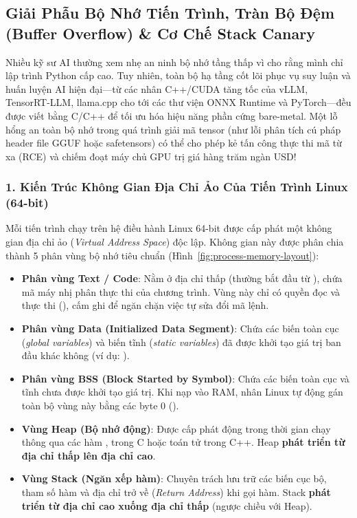 \subsection{Giải Phẫu Bộ Nhớ Tiến Trình, Tràn Bộ Đệm (Buffer Overflow) \& Cơ Chế Stack Canary}
\label{subsec:process-memory-buffer-overflow}
Nhiều kỹ sư AI thường xem nhẹ an ninh bộ nhớ tầng thấp vì cho rằng mình chỉ lập trình Python cấp cao. Tuy nhiên, toàn bộ hạ tầng cốt lõi phục vụ suy luận và huấn luyện AI hiện đại---từ các nhân C++/CUDA tăng tốc của vLLM, TensorRT-LLM, llama.cpp cho tới các thư viện ONNX Runtime và PyTorch---đều được viết bằng C/C++ để tối ưu hóa hiệu năng phần cứng bare-metal. Một lỗ hổng an toàn bộ nhớ trong quá trình giải mã tensor (như lỗi phân tích cú pháp header file GGUF hoặc safetensors) có thể cho phép kẻ tấn công thực thi mã từ xa (RCE) và chiếm đoạt máy chủ GPU trị giá hàng trăm ngàn USD!

\subsubsection{1. Kiến Trúc Không Gian Địa Chỉ Ảo Của Tiến Trình Linux (64-bit)}
Mỗi tiến trình chạy trên hệ điều hành Linux 64-bit được cấp phát một không gian địa chỉ ảo (\textit{Virtual Address Space}) độc lập. Không gian này được phân chia thành 5 phân vùng bộ nhớ tiêu chuẩn (Hình~\ref{fig:process-memory-layout}):
\begin{itemize}
  \item \textbf{Phân vùng Text / Code}: Nằm ở địa chỉ thấp (thường bắt đầu từ ), chứa mã máy nhị phân thực thi của chương trình. Vùng này chỉ có quyền đọc và thực thi (), cấm ghi để ngăn chặn việc tự sửa đổi mã lệnh.
  \item \textbf{Phân vùng Data (Initialized Data Segment)}: Chứa các biến toàn cục (\textit{global variables}) và biến tĩnh (\textit{static variables}) đã được khởi tạo giá trị ban đầu khác không (ví dụ: ).
  \item \textbf{Phân vùng BSS (Block Started by Symbol)}: Chứa các biến toàn cục và tĩnh chưa được khởi tạo giá trị. Khi nạp vào RAM, nhân Linux tự động gán toàn bộ vùng này bằng các byte 0 ().
  \item \textbf{Vùng Heap (Bộ nhớ động)}: Được cấp phát động trong thời gian chạy thông qua các hàm ,  trong C hoặc toán tử  trong C++. Heap \textbf{phát triển từ địa chỉ thấp lên địa chỉ cao}.
  \item \textbf{Vùng Stack (Ngăn xếp hàm)}: Chuyên trách lưu trữ các biến cục bộ, tham số hàm và địa chỉ trở về (\textit{Return Address}) khi gọi hàm. Stack \textbf{phát triển từ địa chỉ cao xuống địa chỉ thấp} (ngược chiều với Heap).
\end{itemize}

